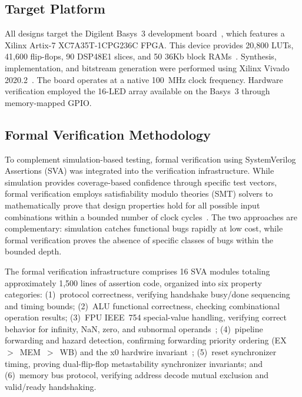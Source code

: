 \documentclass[journal]{IEEEtran}
\begin{document}
\subsection{Target Platform}
\label{sec:platform}

All designs target the Digilent Basys~3 development
board~\cite{digilent2021basys3}, which features a Xilinx Artix-7
XC7A35T-1CPG236C FPGA.  This device provides 20,800 LUTs, 41,600
flip-flops, 90 DSP48E1 slices, and 50 36Kb block
RAMs~\cite{xilinx2020ds180}.  Synthesis, implementation, and bitstream
generation were performed using Xilinx Vivado
2020.2~\cite{xilinx2020ug901}.  The board operates at a native 100~MHz
clock frequency.  Hardware verification employed the 16-LED array
available on the Basys~3 through memory-mapped GPIO.

\subsection{Formal Verification Methodology}
\label{sec:formal}

To complement simulation-based testing, formal verification using
SystemVerilog Assertions (SVA) was integrated into the verification
infrastructure.  While simulation provides coverage-based confidence
through specific test vectors, formal verification employs satisfiability
modulo theories (SMT) solvers to mathematically prove that design
properties hold for all possible input combinations within a bounded
number of clock cycles~\cite{wolf2016symbiyosys}.  The two approaches are
complementary: simulation catches functional bugs rapidly at low cost,
while formal verification proves the absence of specific classes of bugs
within the bounded depth.

The formal verification infrastructure comprises 16 SVA modules totaling
approximately 1,500 lines of assertion code, organized into six property
categories: (1)~protocol correctness, verifying handshake busy/done
sequencing and timing bounds; (2)~ALU functional correctness, checking
combinational operation results; (3)~FPU IEEE~754 special-value handling,
verifying correct behavior for infinity, NaN, zero, and subnormal
operands~\cite{ieee754_2019}; (4)~pipeline forwarding and hazard
detection, confirming forwarding priority ordering (EX~$>$~MEM~$>$~WB)
and the x0 hardwire invariant~\cite{waterman2019riscv}; (5)~reset
synchronizer timing, proving dual-flip-flop metastability synchronizer
invariants; and (6)~memory bus protocol, verifying address decode mutual
exclusion and valid/ready handshaking.
\end{document}
